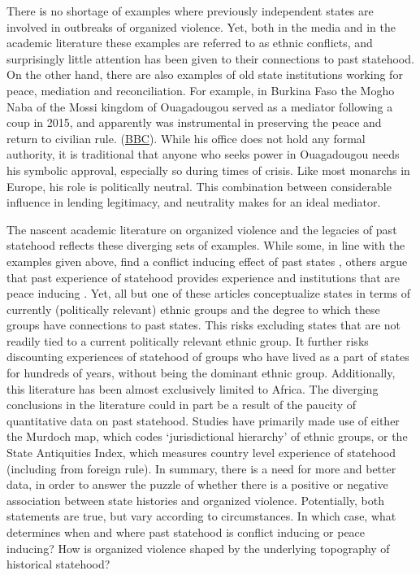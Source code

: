 There is no shortage of examples where previously independent states are
involved in outbreaks of organized violence. Yet, both in the media and in the
academic literature these examples are referred to as ethnic conflicts, and
surprisingly little attention has been given to their connections to past
statehood. On the other hand, there are also examples of old state institutions
working for peace, mediation and reconciliation. For example, in Burkina Faso
the Mogho Naba of the Mossi kingdom of Ouagadougou served as a mediator
following a coup in 2015, and apparently was instrumental in preserving the
peace and return to civilian rule.
(\href{https://www.bbc.com/news/world-africa-34340704}{BBC}). While his office
does not hold any formal authority, it is traditional that anyone who seeks
power in Ouagadougou needs his symbolic approval, especially so during times of
crisis. Like most monarchs in Europe, his role is politically neutral. This
combination between considerable influence in lending legitimacy, and neutrality
makes for an ideal mediator.

The nascent academic literature on organized violence and the legacies of past
statehood reflects these diverging sets of examples. While some, in line with
the examples given above, find a conflict inducing effect of past states
\citep{Englebert2002, Paine2019}, others argue that past experience of statehood
provides experience and institutions that are peace inducing \citep{Wig2016,
Wig2018, Depetris-Chauvin2016}. Yet, all but one of these articles conceptualize
states in terms of currently (politically relevant) ethnic groups and the degree
to which these groups have connections to past states. This risks excluding
states that are not readily tied to a current politically relevant ethnic group.
It further risks discounting experiences of statehood of groups who have lived
as a part of states for hundreds of years, without being the dominant ethnic
group. Additionally, this literature has been almost exclusively limited to
Africa. The diverging conclusions in the literature could in part be a result of
the paucity of quantitative data on past statehood. Studies have primarily made
use of either the Murdoch map, which codes `jurisdictional hierarchy' of ethnic
groups, or the State Antiquities Index, which measures country level experience
of statehood (including from foreign rule). In summary, there is a need for more
and better data, in order to answer the puzzle of whether there is a positive or
negative association between state histories and organized violence.
Potentially, both statements are true, but vary according to circumstances. In
which case, what determines when and where past statehood is conflict inducing
or peace inducing? How is organized violence shaped by the underlying topography
of historical statehood? 

